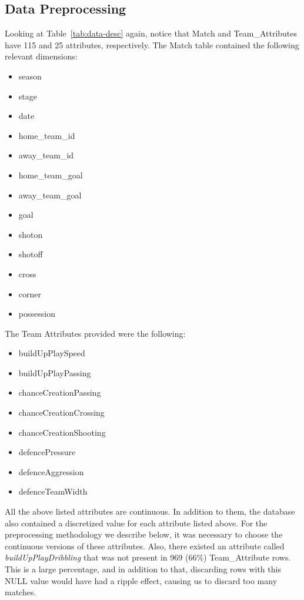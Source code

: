 \documentclass[11pt]{article}
\begin{document}
\subsection{Data Preprocessing}
\label{sec:preprocessing}
Looking at Table~\ref{tab:data-desc} again, notice that Match and Team\_Attributes have 115 and 25 attributes, respectively.
The Match table contained the following relevant dimensions:
\begin{itemize}
  \setlength\itemsep{0em}
  \item season
  \item stage
  \item date
  \item home\_team\_id
  \item away\_team\_id
  \item home\_team\_goal
  \item away\_team\_goal
  \item goal
  \item shoton
  \item shotoff
  \item cross
  \item corner
  \item possession
\end{itemize}
\noindent
The Team Attributes provided were the following:
\begin{itemize}
  \setlength \itemsep{0em}
  \item buildUpPlaySpeed
  \item buildUpPlayPassing
  \item chanceCreationPassing
  \item chanceCreationCrossing
  \item chanceCreationShooting
  \item defencePressure
  \item defenceAggression
  \item defenceTeamWidth
\end{itemize}

All the above listed attributes are continuous.
In addition to them, the database also contained a discretized value for each attribute listed above.
For the preprocessing methodology we describe below, it was necessary to choose the continuous versions of these attributes.
Also, there existed an attribute called \textit{buildUpPlayDribbling} that was not present in 969 (66\%) Team\_Attribute rows.
This is a large percentage, and in addition to that, discarding rows with this NULL value would have had a ripple effect, causing us to discard too many matches.
\end{document}
